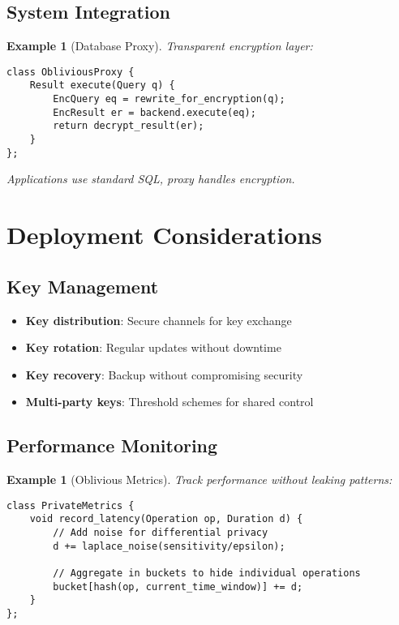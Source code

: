 \documentclass[11pt,final,hidelinks]{article}
\newtheorem{example}[theorem]{Example}
\begin{document}
{\subsection{System Integration}

\begin{example}[Database Proxy]
Transparent encryption layer:
\begin{verbatim}
class ObliviousProxy {
    Result execute(Query q) {
        EncQuery eq = rewrite_for_encryption(q);
        EncResult er = backend.execute(eq);
        return decrypt_result(er);
    }
};
\end{verbatim}
Applications use standard SQL, proxy handles encryption.
\end{example}

\section{Deployment Considerations}

\subsection{Key Management}

\begin{itemize}
    \item \textbf{Key distribution}: Secure channels for key exchange
    \item \textbf{Key rotation}: Regular updates without downtime
    \item \textbf{Key recovery}: Backup without compromising security
    \item \textbf{Multi-party keys}: Threshold schemes for shared control
\end{itemize}

\subsection{Performance Monitoring}

\begin{example}[Oblivious Metrics]
Track performance without leaking patterns:
\begin{verbatim}
class PrivateMetrics {
    void record_latency(Operation op, Duration d) {
        // Add noise for differential privacy
        d += laplace_noise(sensitivity/epsilon);
        
        // Aggregate in buckets to hide individual operations
        bucket[hash(op, current_time_window)] += d;
    }
};
\end{verbatim}
\end{example}

}
\end{document}
